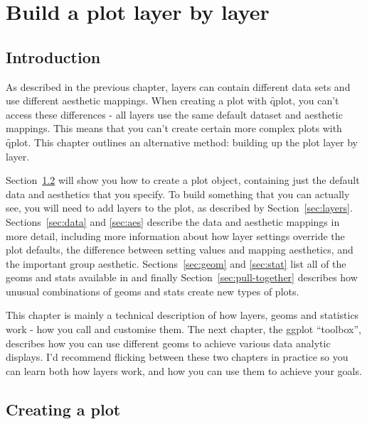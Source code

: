 


\chapter{Build a plot layer by layer}
\label{cha:layers}

\section{Introduction}

As described in the previous chapter, layers can contain different data sets and use different aesthetic mappings.  When creating a plot with \f{qplot}, you can't access these differences - all layers use the same default dataset and aesthetic mappings.  This means that you can't create certain more complex plots with {\f qplot}.  This chapter outlines an alternative method: building up the plot layer by layer.  

Section~\ref{sec:ggplot} will show you how to create a plot object, containing just the default data and aesthetics that you specify.  To build something that you can actually see, you will need to add layers to the plot, as described by Section~\ref{sec:layers}.  Sections~\ref{sec:data} and \ref{sec:aes} describe the data and aesthetic mappings in more detail, including more information about how layer settings override the plot defaults, the difference between setting values and mapping aesthetics, and the important group aesthetic.  Sections~\ref{sec:geom} and \ref{sec:stat} list all of the geoms and stats available in \ggplot and finally Section~\ref{sec:pull-together} describes how unusual combinations of geoms and stats create new types of plots.

This chapter is mainly a technical description of how layers, geoms and statistics work - how you call and customise them.  The next chapter, the ggplot ``toolbox'', describes how you can use different geoms to achieve various data analytic displays.  I'd recommend flicking between these two chapters in practice so you can learn both how layers work, and how you can use them to achieve your goals.

\section{Creating a plot}
\label{sec:ggplot}

